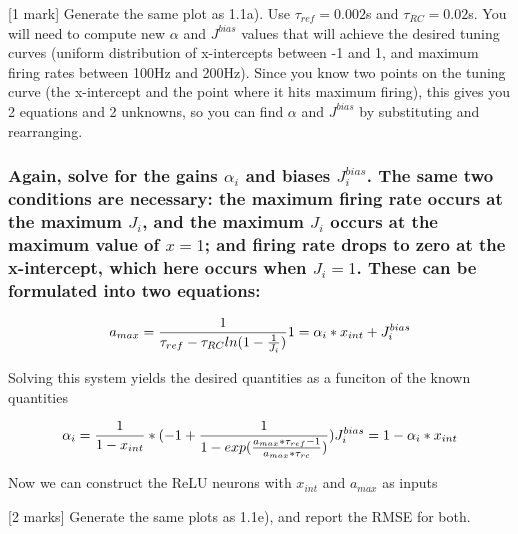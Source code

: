 \documentclass{article}
\begin{document}
    {[}1 mark{]} Generate the same plot as 1.1a). Use $\tau_{ref}=0.002$s
and $\tau_{RC}=0.02$s. You will need to compute new $\alpha$ and
$J^{bias}$ values that will achieve the desired tuning curves (uniform
distribution of x-intercepts between -1 and 1, and maximum firing rates
between 100Hz and 200Hz). Since you know two points on the tuning curve
(the x-intercept and the point where it hits maximum firing), this gives
you 2 equations and 2 unknowns, so you can find $\alpha$ and $J^{bias}$
by substituting and rearranging.

    \subsubsection{Again, solve for the gains $\alpha_i$ and biases
$J_i^{bias}$. The same two conditions are necessary: the maximum firing
rate occurs at the maximum $J_i$, and the maximum $J_i$ occurs at the
maximum value of $x=1$; and firing rate drops to zero at the
x-intercept, which here occurs when $J_i=1$. These can be formulated
into two
equations:}\label{again-solve-for-the-gains-alphaux5fi-and-biases-jux5fibias.-the-same-two-conditions-are-necessary-the-maximum-firing-rate-occurs-at-the-maximum-jux5fi-and-the-maximum-jux5fi-occurs-at-the-maximum-value-of-x1-and-firing-rate-drops-to-zero-at-the-x-intercept-which-here-occurs-when-jux5fi1.-these-can-be-formulated-into-two-equations}

\[
a_{max} = {1 \over {\tau_{ref}-\tau_{RC}ln(1-{1 \over J_i})}} \\
1 = \alpha_i * x_{int} + J_i^{bias}
\]

Solving this system yields the desired quantities as a funciton of the
known quantities

\[
\alpha_i = {1 \over {1-x_{int}}} * (-1 + {1 \over {1-exp({a_{max}*\tau_{ref} - 1 \over {a_{max}*\tau_{rc}}})}}) \\
J_i^{bias} = 1 - \alpha_i * x_{int}
\]

Now we can construct the ReLU neurons with $x_{int}$ and $a_{max}$ as
inputs

    {[}2 marks{]} Generate the same plots as 1.1e), and report the RMSE for
both.
\end{document}
